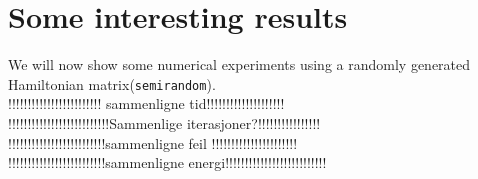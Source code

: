 \chapter{Some interesting results}
We will now show some numerical experiments using a randomly generated Hamiltonian matrix(\texttt{semirandom}).\\

!!!!!!!!!!!!!!!!!!!!!!!! sammenligne tid!!!!!!!!!!!!!!!!!!!!\\
!!!!!!!!!!!!!!!!!!!!!!!!!!Sammenlige iterasjoner?!!!!!!!!!!!!!!!!\\
!!!!!!!!!!!!!!!!!!!!!!!!!sammenligne feil !!!!!!!!!!!!!!!!!!!!!!\\
!!!!!!!!!!!!!!!!!!!!!!!!!sammenligne energi!!!!!!!!!!!!!!!!!!!!!!!!!!\\